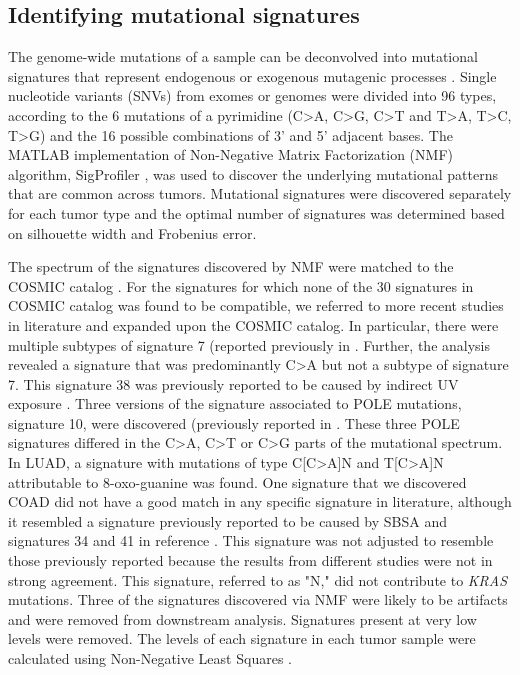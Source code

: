 \documentclass[english, 10pt, letterpaper]{article}
\newcommand{\KRAS}{\emph{KRAS}}
\begin{document}
\subsection*{Identifying mutational signatures}

The genome-wide mutations of a sample can be deconvolved into mutational signatures that represent endogenous or exogenous mutagenic processes \cite{Alexandrov2013}. 
Single nucleotide variants (SNVs) from exomes or genomes were divided into 96 types, according to the 6 mutations of a pyrimidine (C>A, C>G, C>T and T>A, T>C, T>G) and the 16 possible combinations of 3’ and 5’ adjacent bases.
The MATLAB \cite{MATLAB:2010} implementation of Non-Negative Matrix Factorization (NMF) algorithm, SigProfiler \cite{Alexandrov2013}, was used to discover the underlying mutational patterns that are common across tumors. 
Mutational signatures were discovered separately for each tumor type and the optimal number of signatures was determined based on silhouette width and Frobenius error. 

The spectrum of the signatures discovered by NMF were matched to the COSMIC catalog \cite{Tate2019}.
For the signatures for which none of the 30 signatures in COSMIC catalog was found to be compatible, we referred to more recent studies in literature and expanded upon the COSMIC catalog. 
In particular, there were multiple subtypes of signature 7 (reported previously in \cite{Hayward2017Whole-genomeSubtypes., Alexandrov2020TheCancer.}.
Further, the analysis revealed a signature that was predominantly C>A but not a subtype of signature 7.
This signature 38 was previously reported to be caused by indirect UV exposure \cite{Alexandrov2020TheCancer.}. 
Three versions of the signature associated to POLE mutations, signature 10, were discovered (previously reported in \cite{Alexandrov2020TheCancer.}.
These three POLE signatures differed in the C>A, C>T or C>G parts of the mutational spectrum. 
In LUAD, a signature with mutations of type C[C>A]N and T[C>A]N attributable to 8-oxo-guanine \cite{Alexandrov2020TheCancer.} was found. 
One signature that we discovered COAD did not have a good match in any specific signature in literature, although it resembled a signature previously reported to be caused by SBSA \cite{Lee-Six2019} and signatures 34 and 41 in reference \cite{Alexandrov2020TheCancer.}. 
This signature was not adjusted to resemble those previously reported because the results from different studies were not in strong agreement.
This signature, referred to as "N," did not contribute to \KRAS{} mutations.
Three of the signatures discovered via NMF were likely to be artifacts \cite{Costello2013DiscoveryPreparation.} and were removed from downstream analysis. 
Signatures present at very low levels were removed. 
The levels of each signature in each tumor sample were calculated using Non-Negative Least Squares \cite{Gulhan2019DetectingSamples.}.
\end{document}
